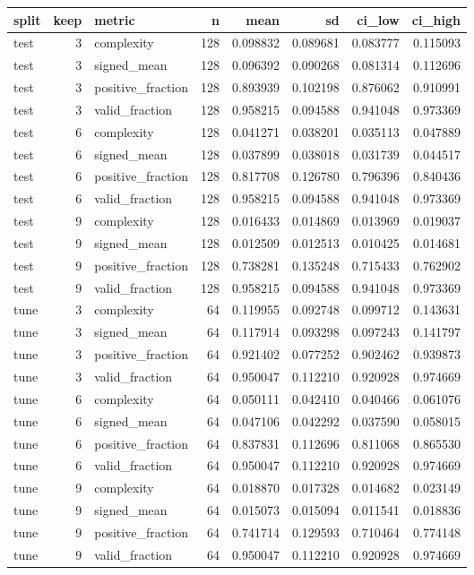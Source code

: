 \begin{tabular}{lrlrrrrr}
\toprule
split & keep & metric & n & mean & sd & ci_low & ci_high \\
\midrule
test & 3 & complexity & 128 & 0.098832 & 0.089681 & 0.083777 & 0.115093 \\
test & 3 & signed_mean & 128 & 0.096392 & 0.090268 & 0.081314 & 0.112696 \\
test & 3 & positive_fraction & 128 & 0.893939 & 0.102198 & 0.876062 & 0.910991 \\
test & 3 & valid_fraction & 128 & 0.958215 & 0.094588 & 0.941048 & 0.973369 \\
test & 6 & complexity & 128 & 0.041271 & 0.038201 & 0.035113 & 0.047889 \\
test & 6 & signed_mean & 128 & 0.037899 & 0.038018 & 0.031739 & 0.044517 \\
test & 6 & positive_fraction & 128 & 0.817708 & 0.126780 & 0.796396 & 0.840436 \\
test & 6 & valid_fraction & 128 & 0.958215 & 0.094588 & 0.941048 & 0.973369 \\
test & 9 & complexity & 128 & 0.016433 & 0.014869 & 0.013969 & 0.019037 \\
test & 9 & signed_mean & 128 & 0.012509 & 0.012513 & 0.010425 & 0.014681 \\
test & 9 & positive_fraction & 128 & 0.738281 & 0.135248 & 0.715433 & 0.762902 \\
test & 9 & valid_fraction & 128 & 0.958215 & 0.094588 & 0.941048 & 0.973369 \\
tune & 3 & complexity & 64 & 0.119955 & 0.092748 & 0.099712 & 0.143631 \\
tune & 3 & signed_mean & 64 & 0.117914 & 0.093298 & 0.097243 & 0.141797 \\
tune & 3 & positive_fraction & 64 & 0.921402 & 0.077252 & 0.902462 & 0.939873 \\
tune & 3 & valid_fraction & 64 & 0.950047 & 0.112210 & 0.920928 & 0.974669 \\
tune & 6 & complexity & 64 & 0.050111 & 0.042410 & 0.040466 & 0.061076 \\
tune & 6 & signed_mean & 64 & 0.047106 & 0.042292 & 0.037590 & 0.058015 \\
tune & 6 & positive_fraction & 64 & 0.837831 & 0.112696 & 0.811068 & 0.865530 \\
tune & 6 & valid_fraction & 64 & 0.950047 & 0.112210 & 0.920928 & 0.974669 \\
tune & 9 & complexity & 64 & 0.018870 & 0.017328 & 0.014682 & 0.023149 \\
tune & 9 & signed_mean & 64 & 0.015073 & 0.015094 & 0.011541 & 0.018836 \\
tune & 9 & positive_fraction & 64 & 0.741714 & 0.129593 & 0.710464 & 0.774148 \\
tune & 9 & valid_fraction & 64 & 0.950047 & 0.112210 & 0.920928 & 0.974669 \\
\bottomrule
\end{tabular}
